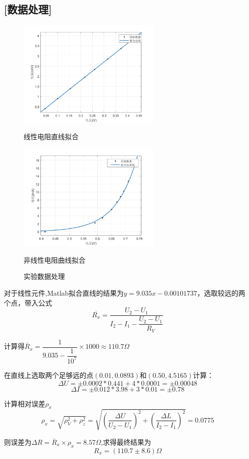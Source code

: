 \documentclass[12pt,a4paper,UTF8]{ctexart}
\begin{document}
	\subsection*{[数据处理]}
			\begin{figure}[h!tbp]
		\centering
		\begin{minipage}[t]{0.48\textwidth}
			\centering
			\includegraphics[width=7cm]{线性电阻图片}
			\caption*{线性电阻直线拟合}
		\end{minipage}
		\begin{minipage}[t]{0.48\textwidth}
			\centering
			\includegraphics[width=7cm]{非线性电阻图片}
			\caption*{非线性电阻曲线拟合}
		\end{minipage}
		\caption{实验数据处理}
	\end{figure}
	\par 对于线性元件,Matlab拟合直线的结果为$y = 9.035x-0.00101737$，选取较远的两个点，带入公式
	\[\overline{R_x}=\frac{U_2-U_1}{I_2-I_1-\dfrac{U_2-U_1}{R_V}}
	\]
	\clearpage
	\par 计算得$\overline{R}_x=\dfrac{1}{9.035-\dfrac{1}{10^7}}\times1000\approx110.7\Omega$
	\par 在直线上选取两个足够远的点$(0.01,0.0893)$和$(0.50,4.5165)$计算：
	\[\Delta U = \pm 0.0002*0.441+4*0.0001 = \pm 0.00048\]
	\[\Delta I = \pm 0.012*3.98+3*0.01 = \pm 0.78\]
	\par 计算相对误差$\rho_x$
	\[\rho_x=\sqrt{\rho_V^2+\rho_z^2}=\sqrt{\left(\frac{\Delta U}{U_2-U_1}\right)^2+\left(\frac{\Delta L}{I_2-I_1}\right)^2}=0.0775\]
	\par 则误差为$\Delta R = \overline{R}_x\times \rho_x = 8.57\Omega$,求得最终结果为
	\[R_x = (110.7\pm 8.6)\Omega \]
\end{document}
